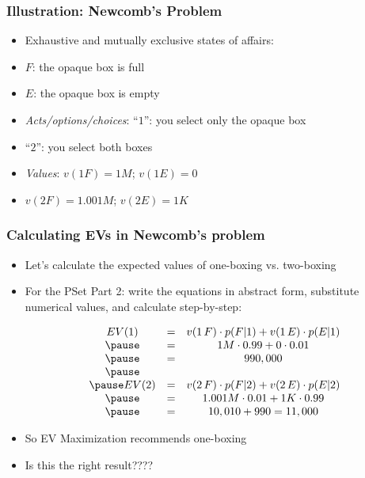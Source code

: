 \begin{frame}
\frametitle{Illustration: Newcomb's Problem}

\begin{itemize}[<+->]

\item Exhaustive and mutually exclusive states of affairs: 
\item[] $F$: the opaque box is full 

\item[] $E$: the opaque box is empty

\item \textit{Acts/options/choices}: ``$1$'': you select only the opaque box 

\item[] ``$2$'': you select both boxes

\item \textit{Values}: $v(1 F) = 1M$; $v(1 E) = 0$

\item[] $v(2 F) = 1.001M$; $v(2 E) = 1K$


\end{itemize}
\end{frame}

\begin{frame}
\frametitle{Calculating EVs in Newcomb's problem}

\begin{itemize}[<+->]

\item Let's calculate the expected values of one-boxing vs. two-boxing

\item For the PSet Part 2: write the equations in abstract form, substitute numerical values, and calculate step-by-step: 

\[
\begin{array}{ccc}
EV(1) &= &v(1\, F) \cdot p(F|1) + v(1\,E) \cdot p(E|1)\\ \pause 
 &= &1M  \cdot 0.99 + 0 \cdot 0.01 \\ \pause 
 &= & 990,000 \\  \pause 
 & & \\ \pause 
EV(2) &= &v(2\, F) \cdot p(F|2) + v(2\,E) \cdot p(E|2)\\ \pause 
 &= &1.001M  \cdot 0.01 + 1K \cdot 0.99 \\ \pause 
 &= & 10,010 + 990 = 11,000 \\ 
\end{array}
\]

\item So EV Maximization recommends one-boxing

\item Is this the right result????

\end{itemize}
\end{frame}

